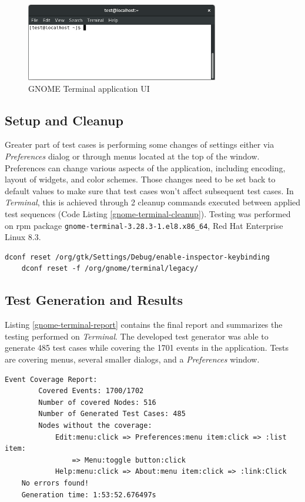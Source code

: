 \begin{figure}[H]
	\centering
	\includegraphics[width=0.75\textwidth,clip]{obrazky-figures/gnome-terminal-ui.png}
	\caption{GNOME Terminal application UI}
	\label{terminal-gui}
\end{figure}

\subsection{Setup and Cleanup}
Greater part of test cases is performing some changes of settings either via \textit{Preferences} dialog or through menus located at the top of the window. Preferences can change various aspects of the application, including encoding, layout of widgets, and color schemes. Those changes need to be set back to default values to make sure that test cases won't affect subsequent test cases. In \textit{Terminal}, this is achieved through 2 cleanup commands executed between applied test sequences (Code Listing \ref{gnome-terminal-cleanup}). Testing was performed on rpm package \texttt{gnome-terminal-3.28.3-1.el8.x86\_64}, Red Hat Enterprise Linux 8.3.

\begin{lstlisting}[caption={Final test generator report},label={gnome-terminal-cleanup}]
    dconf reset /org/gtk/Settings/Debug/enable-inspector-keybinding
    dconf reset -f /org/gnome/terminal/legacy/
\end{lstlisting}

\subsection{Test Generation and Results}

Listing \ref{gnome-terminal-report} contains the final report and summarizes the testing performed on \textit{Terminal}. The developed test generator was able to generate 485 test cases while covering the 1701 events in the application. Tests are covering menus, several smaller dialogs, and a \textit{Preferences} window.

\begin{lstlisting}[caption={Final test generator report},label={gnome-terminal-report}]
    Event Coverage Report:
        Covered Events: 1700/1702
        Number of covered Nodes: 516
        Number of Generated Test Cases: 485 
        Nodes without the coverage:
            Edit:menu:click => Preferences:menu item:click => :list item: 
                => Menu:toggle button:click
            Help:menu:click => About:menu item:click => :link:Click
    No errors found!
    Generation time: 1:53:52.676497s
\end{lstlisting}

